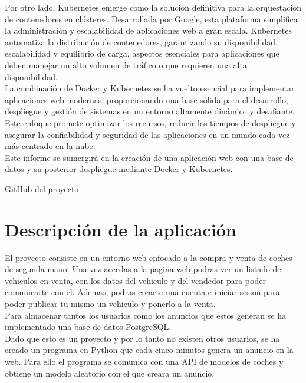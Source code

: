 \documentclass{report}
\begin{document}
        Por otro lado, Kubernetes emerge como la solución definitiva para la orquestación de contenedores en clústeres. Desarrollada por Google, esta plataforma simplifica la administración y escalabilidad de aplicaciones web a gran escala. Kubernetes automatiza la distribución de contenedores, garantizando su disponibilidad, escalabilidad y equilibrio de carga, aspectos esenciales para aplicaciones que deben manejar un alto volumen de tráfico o que requieren una alta disponibilidad.\\
        
        La combinación de Docker y Kubernetes se ha vuelto esencial para implementar aplicaciones web modernas, proporcionando una base sólida para el desarrollo, despliegue y gestión de sistemas en un entorno altamente dinámico y desafiante. Este enfoque promete optimizar los recursos, reducir los tiempos de despliegue y asegurar la confiabilidad y seguridad de las aplicaciones en un mundo cada vez más centrado en la nube.\\
        
        Este informe se sumergirá en la creación de una aplicación web con una base de datos y su posterior despliegue mediante Docker y Kubernetes.

        \vfill
        \begin{center}
            \href{https://github.com/Xabierland/AS-Proyecto}{GitHub del proyecto}
        \end{center}
    \chapter{Descripción de la aplicación}
        El proyecto consiste en un entorno web enfocado a la compra y venta de coches de segunda mano.
        Una vez accedas a la pagina web podras ver un listado de vehiculos en venta, con los datos del vehiculo y del vendedor para poder comunicarte con el.
        Ademas, podras crearte una cuenta e iniciar sesion para poder publicar tu mismo un vehiculo y ponerlo a la venta.\\

        Para almacenar tantos los usuarios como los anuncios que estos generan se ha implementado una base de datos PostgreSQL.\\

        Dado que esto es un proyecto y por lo tanto no existen otros usuarios, se ha creado un programa en Python que cada cinco minutos genera un anuncio en la web.
        Para ello el programa se comunica con una API de modelos de coches y obtiene un modelo aleatorio con el que creara un anuncio.\\
\end{document}

